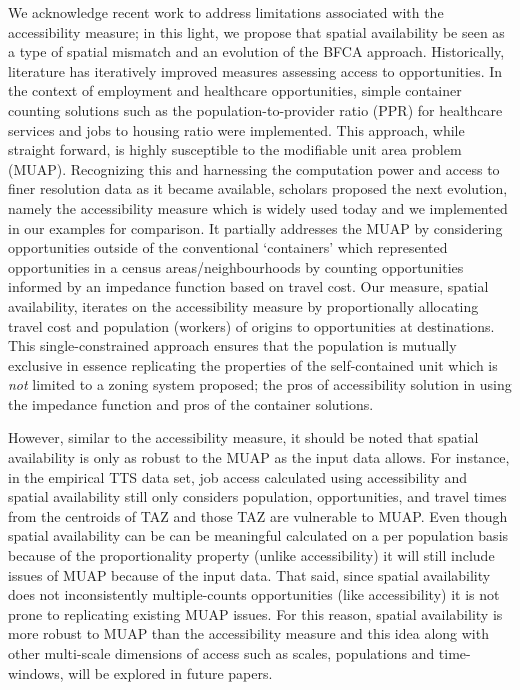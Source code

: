 \documentclass[]{elsarticle} %
\begin{document}
We acknowledge recent work to address limitations associated with the
accessibility measure; in this light, we propose that spatial
availability be seen as a type of spatial mismatch and an evolution of
the BFCA approach. Historically, literature has iteratively improved
measures assessing access to opportunities. In the context of employment
and healthcare opportunities, simple container counting solutions such
as the population-to-provider ratio (PPR) for healthcare services and
jobs to housing ratio were implemented. This approach, while straight
forward, is highly susceptible to the modifiable unit area problem
(MUAP). Recognizing this and harnessing the computation power and access
to finer resolution data as it became available, scholars proposed the
next evolution, namely the accessibility measure which is widely used
today and we implemented in our examples for comparison. It partially
addresses the MUAP by considering opportunities outside of the
conventional `containers' which represented opportunities in a census
areas/neighbourhoods by counting opportunities informed by an impedance
function based on travel cost. Our measure, spatial availability,
iterates on the accessibility measure by proportionally allocating
travel cost and population (workers) of origins to opportunities at
destinations. This single-constrained approach ensures that the
population is mutually exclusive in essence replicating the properties
of the self-contained unit which is \emph{not} limited to a zoning
system proposed; the pros of accessibility solution in using the
impedance function and pros of the container solutions.

However, similar to the accessibility measure, it should be noted that
spatial availability is only as robust to the MUAP as the input data
allows. For instance, in the empirical TTS data set, job access
calculated using accessibility and spatial availability still only
considers population, opportunities, and travel times from the centroids
of TAZ and those TAZ are vulnerable to MUAP. Even though spatial
availability can be can be meaningful calculated on a per population
basis because of the proportionality property (unlike accessibility) it
will still include issues of MUAP because of the input data. That said,
since spatial availability does not inconsistently multiple-counts
opportunities (like accessibility) it is not prone to replicating
existing MUAP issues. For this reason, spatial availability is more
robust to MUAP than the accessibility measure and this idea along with
other multi-scale dimensions of access such as scales, populations and
time-windows, will be explored in future papers.
\end{document}
